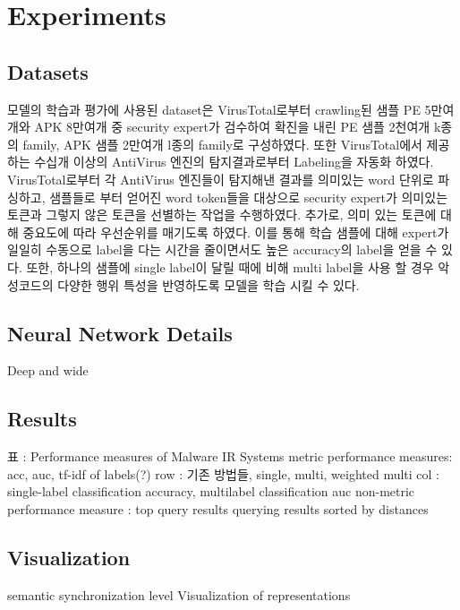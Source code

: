 \section{Experiments}
\subsection{Datasets}
모델의 학습과 평가에 사용된 dataset은 VirusTotal로부터 crawling된 샘플 PE 5만여개와 APK 8만여개 중 security expert가 검수하여 확진을 내린 PE 샘플 2천여개 k종의 family, APK 샘플 2만여개 l종의 family로 구성하였다.
또한 VirusTotal에서 제공하는 수십개 이상의 AntiVirus 엔진의 탐지결과로부터 Labeling을 자동화 하였다. VirusTotal로부터 각 AntiVirus 엔진들이 탐지해낸 결과를 의미있는 word 단위로 파싱하고, 샘플들로 부터 얻어진 word token들을 대상으로 security expert가 의미있는 토큰과 그렇지 않은 토큰을 선별하는 작업을 수행하였다. 추가로, 의미 있는 토큰에 대해 중요도에 따라 우선순위를 매기도록 하였다. 이를 통해 학습 샘플에 대해 expert가 일일히 수동으로 label을 다는 시간을 줄이면서도 높은 accuracy의 label을 얻을 수 있다. 또한, 하나의 샘플에 single label이 달릴 때에 비해 multi label을 사용 할 경우 악성코드의 다양한 행위 특성을 반영하도록 모델을 학습 시킬 수 있다. 

\subsection{Neural Network Details}
Deep and wide


\subsection{Results}

표 : Performance measures of Malware IR Systems
metric performance measures: acc, auc, tf-idf of labels(?)
row : 기존 방법들, single, multi, weighted multi
col : single-label classification accuracy, multilabel classification auc
non-metric performance measure : top query results
querying results sorted by distances

\subsection{Visualization}
semantic synchronization level
Visualization of representations




